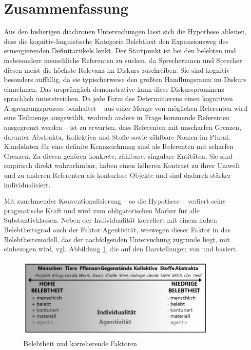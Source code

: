 \section{Zusammenfassung} \label{sec:bel-zusammenfassung}

Aus den bisherigen diachronen Untersuchungen lässt sich die Hypothese ableiten, dass die kognitiv-linguistische Kategorie Belebtheit den Expansionsweg des ermergierenden Definitartikels lenkt. Der Startpunkt ist bei den belebten und insbesondere menschliche Referenten zu suchen, da Sprecherinnen und Sprecher diesen meist die höchste Relevanz im Diskurs zuschreiben.
Sie sind kognitiv besonders auffällig, da sie typischerweise den größten Handlungsraum im Diskurs einnehmen. Das ursprünglich demonstrative  kann diese Diskursprominenz sprachlich unterstreichen. Da jede Form des Determinierens einen kognitiven Abgrenzungsprozess beinhaltet -- aus einer Menge von möglichen Referenten wird eine Teilmenge ausgewählt, wodurch andere in Frage kommende Referenten ausgegrenzt werden -- ist zu erwarten, dass Referenten mit unscharfen Grenzen, darunter Abstrakta, Kollektiva und Stoffe sowie zählbare Nomen im Plural,  Kandidaten für eine definite Kennzeichnung sind als Referenten mit scharfen Grenzen. Zu diesen gehören konkrete, zählbare, singulare Entitäten. Sie sind empirisch direkt wahrnehmbar, haben einen höheren Kontrast zu ihrer Umwelt und zu anderen Referenten als konturlose Objekte und sind dadurch stärker individualisiert. 

Mit zunehmender Konventionalisierung -- so die Hypothese -- verliert  seine pragmatische Kraft und wird zum obligatorischen Marker für alle Substantivklassen. Neben der Individualität korreliert mit einem hohen Belebtheitsgrad auch der Faktor Agentivität, weswegen dieser Faktor in das Belebtheitsmodell, das der nachfolgenden Untersuchung zugrunde liegt, mit einbezogen wird, vgl. Abbildung \ref{abb:belebtheit-gesamt}, die auf den Darstellungen von \textcite[345]{Szczepaniak2011} und \textcite[98]{Nubling2012} basiert.  
    
\begin{figure}[h]
\begin{center}
\includegraphics[width=10cm]{images/belebtheits-skala-neu-sw.jpg}
\caption{Belebtheit und korrelierende Faktoren}
\label{abb:belebtheit-gesamt}
\end{center}
\end{figure}


